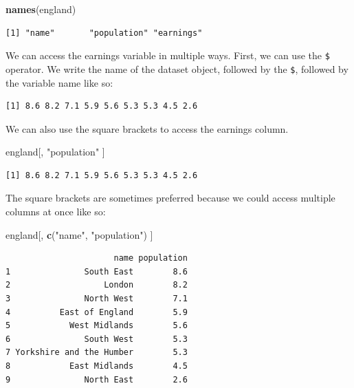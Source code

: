 \documentclass[]{article}
\newenvironment{Shaded}{\begin{snugshade}}{\end{snugshade}}
\newcommand{\KeywordTok}[1]{\textcolor[rgb]{0.13,0.29,0.53}{\textbf{#1}}}
\newcommand{\NormalTok}[1]{#1}
\newcommand{\OperatorTok}[1]{\textcolor[rgb]{0.81,0.36,0.00}{\textbf{#1}}}
\newcommand{\StringTok}[1]{\textcolor[rgb]{0.31,0.60,0.02}{#1}}
\begin{document}
\begin{Shaded}
\begin{Highlighting}[]
\KeywordTok{names}\NormalTok{(england)}
\end{Highlighting}
\end{Shaded}

\begin{verbatim}
[1] "name"       "population" "earnings"  
\end{verbatim}

We can access the earnings variable in multiple ways. First, we can use the \texttt{\$} operator. We write the name of the dataset object, followed by the \texttt{\$}, followed by the variable name like so:

\begin{Shaded}
\end{Shaded}

\begin{verbatim}
[1] 8.6 8.2 7.1 5.9 5.6 5.3 5.3 4.5 2.6
\end{verbatim}

We can also use the square brackets to access the earnings column.

\begin{Shaded}
\begin{Highlighting}[]
\NormalTok{england[, }\StringTok{"population"}\NormalTok{ ]}
\end{Highlighting}
\end{Shaded}

\begin{verbatim}
[1] 8.6 8.2 7.1 5.9 5.6 5.3 5.3 4.5 2.6
\end{verbatim}

The square brackets are sometimes preferred because we could access multiple columns at once like so:

\begin{Shaded}
\begin{Highlighting}[]
\NormalTok{england[, }\KeywordTok{c}\NormalTok{(}\StringTok{"name"}\NormalTok{, }\StringTok{"population"}\NormalTok{) ]}
\end{Highlighting}
\end{Shaded}

\begin{verbatim}
                      name population
1               South East        8.6
2                   London        8.2
3               North West        7.1
4          East of England        5.9
5            West Midlands        5.6
6               South West        5.3
7 Yorkshire and the Humber        5.3
8            East Midlands        4.5
9               North East        2.6
\end{verbatim}
\end{document}
